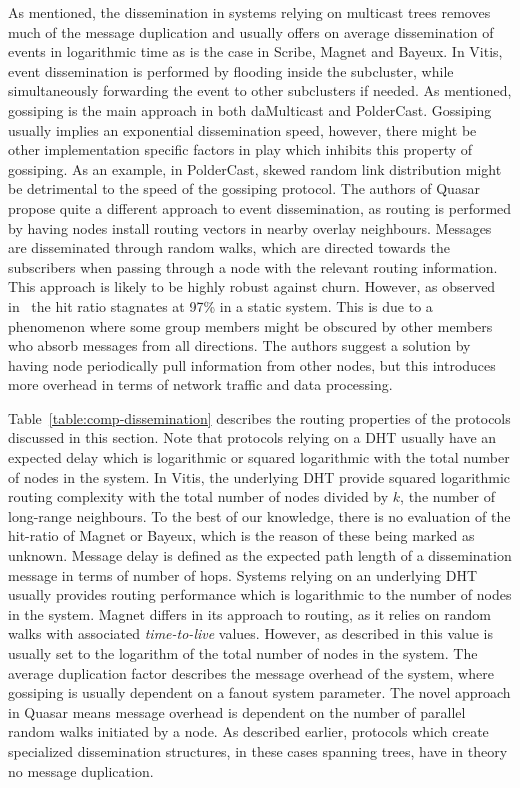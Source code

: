 As mentioned, the dissemination in systems relying on multicast trees
removes much of the message duplication and usually offers on average
dissemination of events in logarithmic time as is the case in Scribe,
Magnet and Bayeux. In Vitis, event dissemination is performed by
flooding inside the subcluster, while simultaneously forwarding the
event to other subclusters if needed. As mentioned, gossiping is the
main approach in both daMulticast and PolderCast.  Gossiping usually
implies an exponential dissemination speed, however, there might be
other implementation specific factors in play which inhibits this
property of gossiping. As an example, in PolderCast, skewed random link
distribution might be detrimental to the speed of the gossiping
protocol. The authors of Quasar~\cite{Wong:2008} propose quite a different approach
to event dissemination, as routing is performed by having nodes install
routing vectors in nearby overlay neighbours. Messages are disseminated
through random walks, which are directed towards the subscribers when
passing through a node with the relevant routing information. This
approach is likely to be highly robust against churn. However, as
observed in~\cite{Wong:2008} the hit ratio stagnates at 97\% in a
static system. This is due to a phenomenon where some group members
might be obscured by other members who absorb messages
from all directions. The authors suggest a solution by having node
periodically pull information from other nodes, but this introduces more
overhead in terms of network traffic and data processing.



Table~\ref{table:comp-dissemination} describes the routing properties of
the protocols discussed in this section. Note that protocols relying on
a DHT usually have an expected delay which is logarithmic or squared
logarithmic with the total number of nodes in the system. In Vitis, the
underlying DHT provide squared logarithmic routing complexity with the
total number of nodes divided by $k$, the number of long-range
neighbours. To the best of our knowledge, there is no evaluation of the
hit-ratio of Magnet or Bayeux, which is the reason of these being marked
as unknown. Message delay is defined as the expected path length of a
dissemination message in terms of number of hops. Systems relying on an
underlying DHT usually provides routing performance which is logarithmic
to the number of nodes in the system.  Magnet differs in its approach to
routing, as it relies on random walks with associated \emph{time-to-live} values.
However, as described in \cite{Girdzijauskas:2010} this value is usually
set to the logarithm of the total number of nodes in the system. The
average duplication factor describes the message overhead of the system,
where gossiping is usually dependent on a fanout system parameter. The
novel approach in Quasar means message overhead is dependent on the
number of parallel random walks initiated by a node. As described
earlier, protocols which create specialized dissemination structures, in
these cases spanning trees, have in theory no message duplication.

